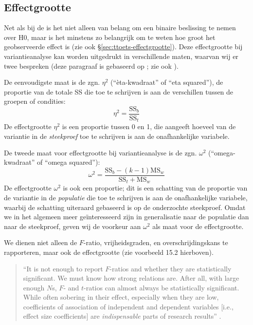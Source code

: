 \documentclass[
]{book}
\begin{document}
\hypertarget{sec:anova-oneway-effectgrootte}{%
\subsection{Effectgrootte}\label{sec:anova-oneway-effectgrootte}}

Net als bij de is het niet alleen van belang om een binaire beslissing
te nemen over H0, maar is het minstens zo belangrijk om te weten hoe
groot het geobserveerde effect is (zie ook
§\ref{sec:ttoets-effectgrootte}). Deze effectgrootte bij
variantieanalyse kan worden uitgedrukt in verschillende maten, waarvan
wij er twee bespreken (deze paragraaf is gebaseerd op \citet{KL00}; zie ook \citet{Olej03}).

De eenvoudigste maat is de zgn. \(\eta^2\) (``èta-kwadraat'' of ``eta
squared''), de proportie van de totale SS die toe te schrijven is aan de
verschillen tussen de groepen of condities: \[\label{eq:etasq}
    \eta^2 = \frac{ \textrm{SS}_b } { \textrm{SS}_t }\] De effectgrootte
\(\eta^2\) is een proportie tussen 0 en 1, die aangeeft hoeveel van de
variantie in de \emph{steekproef} toe te schrijven is aan de onafhankelijke
variabele.

De tweede maat voor effectgrootte bij variantieanalyse is de zgn.
\(\omega^2\) (``omega-kwadraat'' of ``omega squared''):
\begin{equation}
  \label{eq:omegasq}
    \omega^2 = \frac{ \textrm{SS}_b - (k-1) \textrm{MS}_w} { \textrm{SS}_t + \textrm{MS}_w }
\end{equation}
De effectgrootte \(\omega^2\) is ook een proportie; dit is een schatting
van de proportie van de variantie in de \emph{populatie} die toe te schrijven
is aan de onafhankelijke variabele, waarbij de schatting uiteraard
gebaseerd is op de onderzochte steekproef. Omdat we in het algemeen meer
geïnteresseerd zijn in generalisatie naar de populatie dan naar de
steekproef, geven wij de voorkeur aan \(\omega^2\) als maat voor de
effectgrootte.

We dienen niet alleen de \(F\)-ratio, vrijheidsgraden, en
overschrijdingskans te rapporteren, maar ook de effectgrootte (zie
voorbeeld 15.2 hierboven).

\begin{quote}
``It is not enough to report
\(F\)-ratios and whether they are statistically significant. We must know
how strong relations are. After all, with large enough \(N\)s, \(F\)- and
\(t\)-ratios can almost always be statistically significant. While often
sobering in their effect, especially when they are low, coefficients of
association of independent and dependent variables {[}i.e., effect size
coefficients{]} are \emph{indispensable} parts of research results'' \citep[ p.327, nadruk toegevoegd]{KL00}.
\end{quote}
\end{document}
